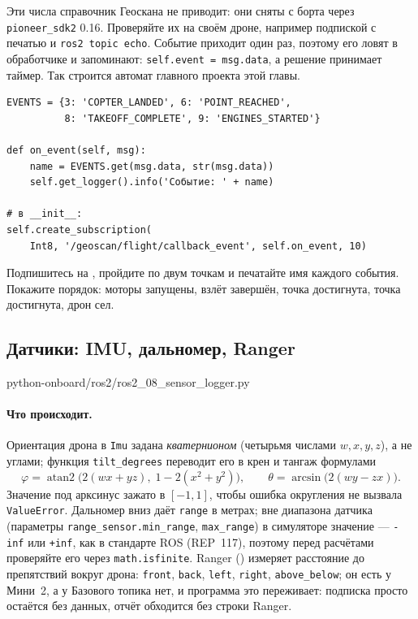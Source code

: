 Эти числа справочник Геоскана не приводит: они сняты с борта через \texttt{pioneer\_sdk2} 0.16. Проверяйте их на своём дроне, например подпиской с печатью и \verb|ros2 topic echo|. Событие приходит один раз, поэтому его ловят в обработчике и запоминают: \verb|self.event = msg.data|, а решение принимает таймер. Так строится автомат главного проекта этой главы.

\begin{codebox}
\small
\begin{verbatim}
EVENTS = {3: 'COPTER_LANDED', 6: 'POINT_REACHED',
          8: 'TAKEOFF_COMPLETE', 9: 'ENGINES_STARTED'}

def on_event(self, msg):
    name = EVENTS.get(msg.data, str(msg.data))
    self.get_logger().info('Событие: ' + name)

# в __init__:
self.create_subscription(
    Int8, '/geoscan/flight/callback_event', self.on_event, 10)
\end{verbatim}
\end{codebox}

\begin{taskbox}
Подпишитесь на , пройдите по двум точкам и печатайте имя каждого события. Покажите порядок: моторы запущены, взлёт завершён, точка достигнута, точка достигнута, дрон сел.
\end{taskbox}

\subsection{Датчики: IMU, дальномер, Ranger}

\begin{codefile}[python]{python-onboard/ros2/ros2_08_sensor_logger.py}
\end{codefile}

\paragraph{Что происходит.} Ориентация дрона в \verb|Imu| задана \emph{кватернионом} (четырьмя числами $w, x, y, z$), а не углами; функция \verb|tilt_degrees| переводит его в крен и тангаж формулами
\[
\varphi = \operatorname{atan2}\bigl(2(wx + yz),\; 1 - 2(x^2 + y^2)\bigr),\qquad
\theta = \arcsin\bigl(2(wy - zx)\bigr).
\]
Значение под арксинус зажато в $[-1, 1]$, чтобы ошибка округления не вызвала \verb|ValueError|. Дальномер вниз  даёт \verb|range| в метрах; вне диапазона датчика (параметры \verb|range_sensor.min_range|, \verb|max_range|) в симуляторе значение --- \verb|-inf| или \verb|+inf|, как в стандарте ROS (REP~117), поэтому перед расчётами проверяйте его через \verb|math.isfinite|. Ranger () измеряет расстояние до препятствий вокруг дрона: \verb|front|, \verb|back|, \verb|left|, \verb|right|, \verb|above_below|; он есть у Мини~2, а у Базового топика нет, и программа это переживает: подписка просто остаётся без данных, отчёт обходится без строки Ranger.

